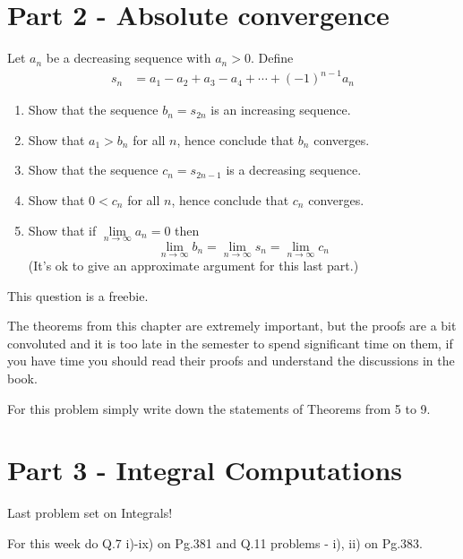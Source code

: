 \documentclass[9pt, a4paper, oneside, reqno]{amsart}
\begin{document}
\newpage
\section*{Part 2 - Absolute convergence}
\begin{questions}[resume]
	\item Let $ {a_n}$ be a decreasing sequence with $ a_n > 0$. Define
	\begin{align*}
		s_n & = a_1 - a_2 + a_3 - a_4 + \cdots + (-1)^{n-1}a_n
	\end{align*}
	\begin{enumerate}
		\item Show that the sequence $ b_n = s_{2n}$ is an increasing sequence.
		\item Show that $ a_1 > b_n$ for all $ n$, hence conclude that $ b_n$ converges.
		\item Show that the sequence $ c_n = s_{2n-1}$ is a decreasing sequence.
		\item Show that $ 0 < c_n$ for all $ n$, hence conclude that $ c_n $ converges.
		\item Show that if $ \lim \limits_{n \rightarrow \infty} a_n = 0$ then $$ \lim \limits_{n \rightarrow \infty} b_n = \lim \limits_{n \rightarrow \infty} s_n = \lim \limits_{n \rightarrow \infty} c_n$$
		      (It's ok to give an approximate argument for this last part.)
	\end{enumerate}

	\item This question is a freebie.

	The theorems from this chapter are extremely important, but the proofs are a bit convoluted and it is too late in the semester to spend significant time on them, if you have time you should read their proofs and understand the discussions in the book.

	For this problem simply write down the statements of Theorems from 5 to 9.
\end{questions}


\newpage
\section*{Part 3 - Integral Computations}
Last problem set on Integrals!
\begin{questions}[resume]
	\item For this week do Q.7 i)-ix) on Pg.381 and Q.11 problems - i), ii) on Pg.383.

\end{questions}
\end{document}
